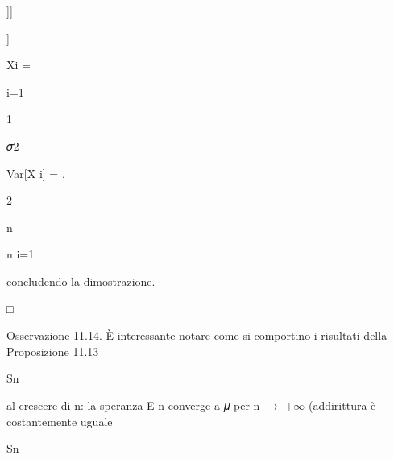 \documentclass[a4paper,portrait,12pt]{article}
\begin{document}
]]


]





\begin{flushleft}
Xi =
\end{flushleft}


\begin{flushleft}
i=1
\end{flushleft}





1


\begin{flushleft}
𝜎2
\end{flushleft}


\begin{flushleft}
Var[X i] = ,
\end{flushleft}


2


\begin{flushleft}
n
\end{flushleft}


\begin{flushleft}
n i=1
\end{flushleft}





\begin{flushleft}
concludendo la dimostrazione.
\end{flushleft}





□





\begin{flushleft}
Osservazione 11.14. \`{E} interessante notare come si comportino i risultati della Proposizione 11.13
\end{flushleft}


\begin{flushleft}
Sn
\end{flushleft}


\begin{flushleft}
al crescere di n: la speranza E n converge a 𝜇 per n $\rightarrow$ +$\infty$ (addirittura \`{e} costantemente uguale
\end{flushleft}


\begin{flushleft}
Sn
\end{flushleft}
\end{document}

